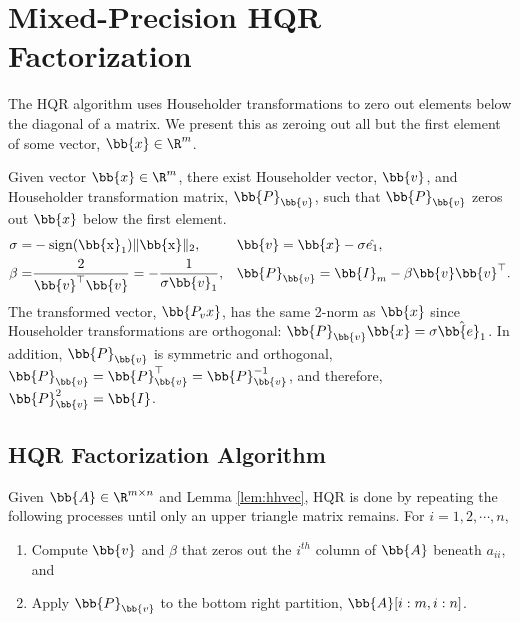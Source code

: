 \section{Mixed-Precision HQR Factorization}
\label{sec:HQRf}

The HQR algorithm uses %
Householder transformations to zero out elements below the diagonal of a matrix. 
We present this %
as zeroing out all but the first element of some vector, $\bb{x}\in\R^m$.


\begin{lemma}
	Given vector $\bb{x}\in\R^{m}$, there exist Householder vector, $\bb{v}$, and Householder transformation matrix, $\bb{P}_{\bb{v}}$, such that $\bb{P}_{\bb{v}}$ zeros out $\bb{x}$ below the first element. 
	\begin{equation}
	\begin{alignedat}{3} 
	\sigma =& -\rm{sign}(\bb{x}_1)\|\bb{x}\|_2, &&\quad  \bb{v} = \bb{x} -\sigma \hat{e_1},\\
	\beta = & \frac{2}{\bb{v}^{\top}\bb{v}}=-\frac{1}{\sigma\bb{v}_1}, && \quad \bb{P}_{\bb{v}}=  \bb{I}_{m} - \beta \bb{v}\bb{v}^{\top}.
	\end{alignedat}
	\label{eqn:HH} 
	\end{equation}
	The transformed vector, $\bb{P_vx}$, has the same 2-norm as $\bb{x}$ since Householder transformations are orthogonal: $\bb{P}_{\bb{v}}\bb{x} = \sigma\hat{\bb{e}_1}$.
	In addition, $\bb{P}_{\bb{v}}$ is symmetric and orthogonal, $\bb{P}_{\bb{v}}=\bb{P}_{\bb{v}}^{\top}=\bb{P}_{\bb{v}}^{-1}$, and therefore, $\bb{P}_{\bb{v}}^2=\bb{I}$.
	\label{lem:hhvec}
\end{lemma}

\subsection{HQR Factorization Algorithm}
\label{sec:HQRfA}
Given $\bb{A}\in\R^{m\times n}$ and Lemma \ref{lem:hhvec}, HQR is done by repeating the following processes until only an upper triangle matrix remains.
For $i = 1, 2, \cdots, n,$
\begin{enumerate}[Step 1)]
	\item Compute $\bb{v}$ and $\beta$ that zeros out the $i^{th}$ column of $\bb{A}$ beneath $a_{ii}$, and
	\item Apply $\bb{P}_{\bb{v}}$ to the bottom right partition, $\bb{A}[i:m, i:n]$.
\end{enumerate}

